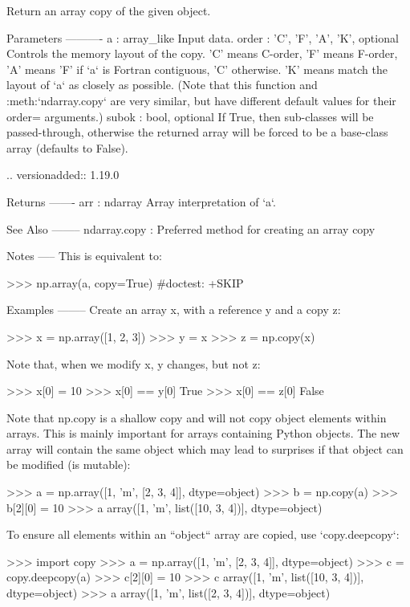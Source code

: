 \begin{DoxyVerb}Return an array copy of the given object.

Parameters
----------
a : array_like
    Input data.
order : {'C', 'F', 'A', 'K'}, optional
    Controls the memory layout of the copy. 'C' means C-order,
    'F' means F-order, 'A' means 'F' if `a` is Fortran contiguous,
    'C' otherwise. 'K' means match the layout of `a` as closely
    as possible. (Note that this function and :meth:`ndarray.copy` are very
    similar, but have different default values for their order=
    arguments.)
subok : bool, optional
    If True, then sub-classes will be passed-through, otherwise the
    returned array will be forced to be a base-class array (defaults to False).

    .. versionadded:: 1.19.0

Returns
-------
arr : ndarray
    Array interpretation of `a`.

See Also
--------
ndarray.copy : Preferred method for creating an array copy

Notes
-----
This is equivalent to:

>>> np.array(a, copy=True)  #doctest: +SKIP

Examples
--------
Create an array x, with a reference y and a copy z:

>>> x = np.array([1, 2, 3])
>>> y = x
>>> z = np.copy(x)

Note that, when we modify x, y changes, but not z:

>>> x[0] = 10
>>> x[0] == y[0]
True
>>> x[0] == z[0]
False

Note that np.copy is a shallow copy and will not copy object
elements within arrays. This is mainly important for arrays
containing Python objects. The new array will contain the
same object which may lead to surprises if that object can
be modified (is mutable):

>>> a = np.array([1, 'm', [2, 3, 4]], dtype=object)
>>> b = np.copy(a)
>>> b[2][0] = 10
>>> a
array([1, 'm', list([10, 3, 4])], dtype=object)

To ensure all elements within an ``object`` array are copied,
use `copy.deepcopy`:

>>> import copy
>>> a = np.array([1, 'm', [2, 3, 4]], dtype=object)
>>> c = copy.deepcopy(a)
>>> c[2][0] = 10
>>> c
array([1, 'm', list([10, 3, 4])], dtype=object)
>>> a
array([1, 'm', list([2, 3, 4])], dtype=object)\end{DoxyVerb}
 \mbox{\label{namespacenumpy_1_1lib_1_1function__base_a42d342f0c8b4195a01e7eb3664e77973}} 
